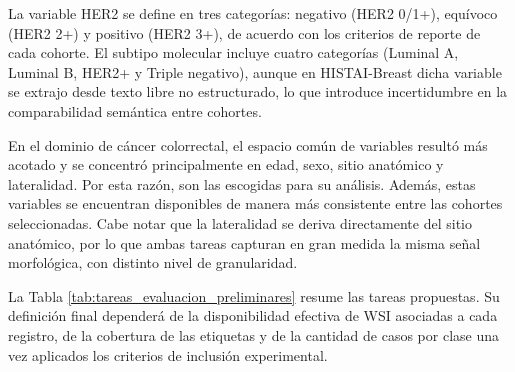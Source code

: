 La variable HER2 se define en tres categorías: negativo (HER2 0/1+), equívoco (HER2 2+) y positivo (HER2 3+), de acuerdo con los criterios de reporte de cada cohorte. El subtipo molecular incluye cuatro categorías (Luminal A, Luminal B, HER2+ y Triple negativo), aunque en HISTAI-Breast dicha variable se extrajo desde texto libre no estructurado, lo que introduce incertidumbre en la comparabilidad semántica entre cohortes.

En el dominio de cáncer colorrectal, el espacio común de variables resultó más acotado y se concentró principalmente en edad, sexo, sitio anatómico y lateralidad. Por esta razón, son las escogidas para su análisis. Además, estas variables se encuentran disponibles de manera más consistente entre las cohortes seleccionadas. Cabe notar que la lateralidad se deriva directamente del sitio anatómico, por lo que ambas tareas capturan en gran medida la misma señal morfológica, con distinto nivel de granularidad.

La Tabla \ref{tab:tareas_evaluacion_preliminares} resume las tareas propuestas. Su definición final dependerá de la disponibilidad efectiva de WSI asociadas a cada registro, de la cobertura de las etiquetas y de la cantidad de casos por clase una vez aplicados los criterios de inclusión experimental.

\begin{table}[htbp]
\centering
\caption{Tareas de evaluación definidas a partir de las variables armonizadas.}
\label{tab:tareas_evaluacion_preliminares}
\small
{}
\end{table}

